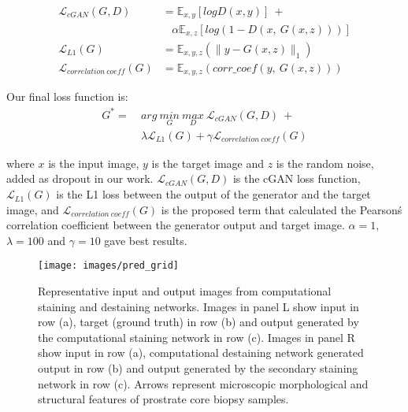 \documentclass[10pt, conference, compsocconf]{IEEEtran}
\begin{document}
\begin{align*}
\mathcal{L}_{cGAN}(G, D) &=\mathbb{E}_{x,y}[log D(x, y)]\ + \\ & \ \ \ \ \alpha \mathbb{E}_{x,z}[log(1-D(x,\ G(x, z)))]\\
\mathcal{L}_{L1}(G) &= \mathbb{E}_{x,y,z}(\parallel y-G(x,z) \parallel_{1})\\
\mathcal{L}_{correlation\ coeff}(G) &= \mathbb{E}_{x,y,z}(corr\_coef(y,\ G(x,z)))
\label{equation_1}
\end{align*}

Our final loss function is:
\begin{align*}
G^{*} =\ & arg\ \underset{G}{min}\ \underset{D}{max}\ \mathcal{L}_{cGAN}(G, D)\ + \\ & \lambda \mathcal{L}_{L1}(G) + \gamma \mathcal{L}_{correlation\ coeff}(G)
\end{align*}

where $x$ is the input image, $y$ is the target image and $z$ is the random noise, added as dropout in our work. $\mathcal{L}_{cGAN}(G, D)$ is the cGAN loss function, $\mathcal{L}_{L1}(G)$ is the L1 loss between the output of the generator and the target image, and $\mathcal{L}_{correlation\ coeff}(G)$ is the proposed term that calculated the Pearson\'s correlation coefficient between the generator output and target image. $\alpha=1$, $\lambda=100$ and $\gamma=10$ gave best results.

\begin{figure*}[h]
	\begin{center}
  		\texttt{[image: images/pred\_grid]}
	\end{center}
	\caption{Representative input and output images from computational staining and destaining networks.  Images in panel L show input in row (a), target (ground truth) in row (b) and output generated by the computational staining network in row (c).  Images in panel R show input in row (a), computational destaining network generated output in row (b) and output generated by the secondary staining network in row (c). Arrows represent microscopic morphological and structural features of prostrate core biopsy samples.}
    \label{fig: model_results}
\end{figure*}
\end{document}
